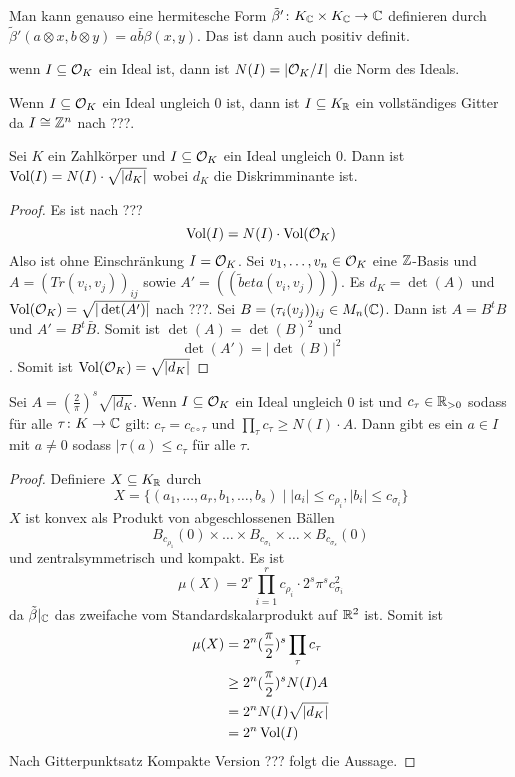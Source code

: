 \begin{Bem}
	Man kann genauso eine hermitesche Form \(\tilde\beta'\colon K_{\mathbb{C}}\times K_{\mathbb{C}}\to \mathbb{C}\) definieren durch \(\tilde \beta'(a\otimes x,b\otimes y)=a\bar{b}\beta(x,y)\). Das ist dann auch positiv definit.
\end{Bem}
\begin{Def}
	wenn \(I\subseteq \mathcal{O}_K\) ein Ideal ist, dann ist 
	\(N(I)=|\mathcal{O}_K/I|\) die Norm des Ideals.
\end{Def}
\begin{Bem}
	Wenn \(I\subseteq \mathcal{O}_K\) ein Ideal ungleich 0 ist, dann ist \(I\subseteq K_{\mathbb{R}}\) ein vollständiges Gitter da \(I\cong \mathbb{Z}^n\) nach ???.
\end{Bem}
\begin{Satz}
	Sei \(K\) ein Zahlkörper und \(I\subseteq \mathcal{O}_K\) ein Ideal ungleich \(0\). Dann ist
	\(\operatorname{Vol}(I)=N(I)\cdot\sqrt{|d_K|}\) wobei \(d_K\) die Diskrimminante ist.
\end{Satz}
\begin{proof}
	Es ist nach ???
	\[\operatorname{Vol}(I)=N(I)\cdot \operatorname{Vol}(\mathcal{O}_K)\]
	Also ist ohne Einschränkung \(I=\mathcal{O}_K\). Sei
	\(v_1,\dots,v_n\in\mathcal{O}_K\) eine \(\mathbb{Z}\)-Basis und
	\(A=(Tr(v_i,v_j))_{ij}\) sowie \(A'=((\tilde beta(v_i,v_j)))\). Es \(d_K=\det(A)\) und 
	\(\operatorname{Vol}(\mathcal{O}_K)=\sqrt{|\det(A')|}\) nach ???.
	Sei \(B=(\tau_i(v_j))_{ij}\in M_n(\mathbb{C})\).
	Dann ist \(A=B^tB\) und \(A'=B^t\bar B\).
	Somit ist \(\det(A)=\det(B)^2\) und 
	\[\det(A')=|\det(B)|^2\].
	Somit ist \(\operatorname{Vol}(\mathcal{O}_K)=\sqrt{|d_K|}\)
\end{proof}
\begin{Satz}
	Sei \(A=(\frac 2 \pi)^s\sqrt{|d_K}\). Wenn \(I\subseteq \mathcal{O}_K\) ein Ideal ungleich 0 ist und 
	\(c_\tau\in\mathbb{R}_{>0}\) sodass für alle \(\tau\colon K\to\mathbb{C}\) gilt: \(c_\tau=c_{c\circ\tau}\) und
	\(\prod_\tau c_\tau\geq N(I)\cdot A\).
	Dann gibt es ein \(a\in I\) mit \(a\neq 0\) sodass
	\(|\tau(a)\leq c_\tau\) für alle \(\tau\).
\end{Satz}
\begin{proof}
	Definiere \(X\subseteq K_{\mathbb{R}}\) durch
	\[X=\{(a_1,\dots,a_r,b_1,\dots,b_s)\mid |a_i|\leq c_{\rho_i}, |b_i|\leq c_{\sigma_i}\}\]
	\(X\) ist konvex als Produkt von abgeschlossenen Bällen
	\[B_{c_{\rho_1}}(0)\times\dots \times B_{c_{\sigma_1}}\times\dots\times B_{c_{\sigma_s}}(0)\]
	und zentralsymmetrisch und kompakt.
	Es ist 
	\[\mu(X)=2^r\prod_{i=1}^rc_{\rho_i}\cdot 2^s\pi^sc_{\sigma_i}^2\] da \(\tilde\beta|_{\mathbb{C}}\) das zweifache vom Standardskalarprodukt auf \(\mathbb{R}^2\) ist.
	Somit ist 
	\begin{align*}
		\mu(X)&=2^n(\frac \pi 2)^s\prod_\tau c_\tau\\
		&\geq 2^n(\frac \pi 2)^sN(I)A\\
		&=2^nN(I)\sqrt{|d_K|}\\
		&=2^n\operatorname{Vol}(I)
		\end{align*}
	Nach Gitterpunktsatz Kompakte Version ??? folgt die Aussage.
\end{proof}
